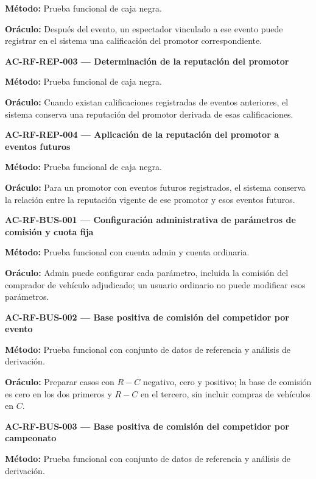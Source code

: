 \documentclass[10pt,letterpaper]{article}
\begin{document}
\textbf{Método:} Prueba funcional de caja negra.\par
\textbf{Oráculo:} Después del evento, un espectador vinculado a ese evento puede registrar en el sistema una calificación del promotor correspondiente.\par\vspace{0.45em}
\noindent\textbf{AC-RF-REP-003 --- Determinación de la reputación del promotor}\par
\textbf{Método:} Prueba funcional de caja negra.\par
\textbf{Oráculo:} Cuando existan calificaciones registradas de eventos anteriores, el sistema conserva una reputación del promotor derivada de esas calificaciones.\par\vspace{0.45em}
\noindent\textbf{AC-RF-REP-004 --- Aplicación de la reputación del promotor a eventos futuros}\par
\textbf{Método:} Prueba funcional de caja negra.\par
\textbf{Oráculo:} Para un promotor con eventos futuros registrados, el sistema conserva la relación entre la reputación vigente de ese promotor y esos eventos futuros.\par\vspace{0.45em}
\noindent\textbf{AC-RF-BUS-001 --- Configuración administrativa de parámetros de comisión y cuota fija}\par
\textbf{Método:} Prueba funcional con cuenta admin y cuenta ordinaria.\par
\textbf{Oráculo:} Admin puede configurar cada parámetro, incluida la comisión del comprador de vehículo adjudicado; un usuario ordinario no puede modificar esos parámetros.\par\vspace{0.45em}
\noindent\textbf{AC-RF-BUS-002 --- Base positiva de comisión del competidor por evento}\par
\textbf{Método:} Prueba funcional con conjunto de datos de referencia y análisis de derivación.\par
\textbf{Oráculo:} Preparar casos con $R-C$ negativo, cero y positivo; la base de comisión es cero en los dos primeros y $R-C$ en el tercero, sin incluir compras de vehículos en $C$.\par\vspace{0.45em}
\noindent\textbf{AC-RF-BUS-003 --- Base positiva de comisión del competidor por campeonato}\par
\textbf{Método:} Prueba funcional con conjunto de datos de referencia y análisis de derivación.\par
\end{document}
